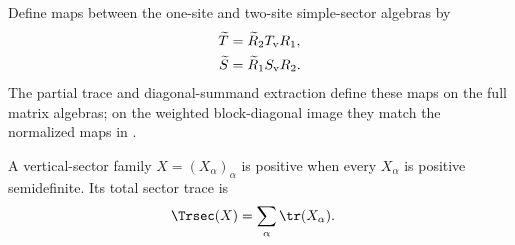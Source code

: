 \begin{definition}
    \label{def:mpdo_transported_vertical_sector_maps}
    \leanok
    Define maps between the one-site and two-site simple-sector algebras by
    \begin{align}
        \widetilde T
         & =\widetilde R_2T_{\mathrm v}R_1,
        \notag                              \\
        \widetilde S
         & =\widetilde R_1S_{\mathrm v}R_2.
        \notag
    \end{align}
    The partial trace and diagonal-summand extraction define these maps on the
    full matrix algebras; on the weighted block-diagonal image they match the
    normalized maps in
    \cite[Appendix~C.4, lines~1972--1979]{Cirac2016MPDO_arXiv}.
\end{definition}

\begin{definition}
    \label{def:mpdo_positive_vertical_sector_family}
    \leanok
    A vertical-sector family $X=(X_\alpha)_\alpha$ is positive when every
    $X_\alpha$ is positive semidefinite. Its total sector trace is
    \begin{align}
        \Trsec(X)
         & =\sum_\alpha\tr(X_\alpha).
        \notag
    \end{align}
\end{definition}


